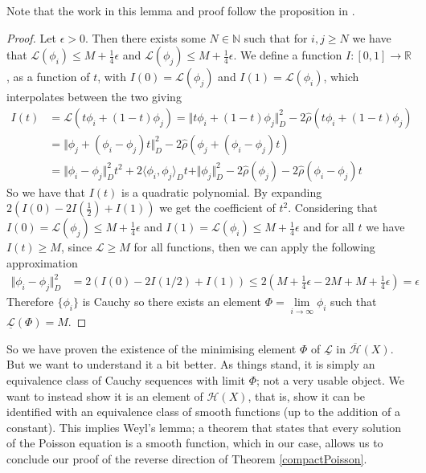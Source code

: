 \documentclass[11pt]{report}
\theoremstyle{definition}
\begin{document}
Note that the work in this lemma and proof follow the proposition in \cite[p.30]{notes}.
\begin{proof}
  Let $\epsilon > 0$. Then there exists some $N \in \mathbb{N}$ such that for $i,j \geq N$ we have that $\mathcal{L}(\phi_i) \leq M + \frac{1}{4}\epsilon$ and $\mathcal{L}(\phi_j) \leq M + \frac{1}{4}\epsilon$. We define a function $I:[0,1] \rightarrow \mathbb{R}$, as a function of $t$, with $I(0) = \mathcal{L}(\phi_j)$ and $I(1) = \mathcal{L}(\phi_i)$, which interpolates between the two giving
  \begin{align*}
    I(t) &= \mathcal{L}(t\phi_i + (1-t)\phi_j) = \Vert t\phi_i + (1-t)\phi_j \Vert^2_D - 2\hat{\rho}(t\phi_i + (1-t)\phi_j) \\
         &= \Vert \phi_j + (\phi_i - \phi_j)t \Vert^2_D - 2\hat{\rho}(\phi_j + (\phi_i - \phi_j)t) \\
         &= \Vert \phi_i - \phi_j \Vert^2_Dt^2 + 2\langle \phi_i, \phi_j\rangle_Dt + \Vert \phi_j \Vert^2_D - 2\hat{\rho}(\phi_j) - 2\hat{\rho}(\phi_i - \phi_j)t
  \end{align*}
  So we have that $I(t)$ is a quadratic polynomial. By expanding $2(I(0) - 2I(\frac{1}{2})+I(1))$ we get the coefficient of $t^2$. Considering that $I(0)= \mathcal{L}(\phi_j) \leq  M + \frac{1}{4}\epsilon$ and $I(1) = \mathcal{L}(\phi_i) \leq  M + \frac{1}{4}\epsilon$ and for all $t$ we have $I(t) \geq M$, since $\mathcal{L} \geq M$ for all functions, then we can apply the following approximation
  \begin{align*}
    \Vert \phi_i - \phi_j \Vert^2_D &= 2(I(0) - 2I(1/2)+I(1)) \leq 2(M + \frac{1}{4}\epsilon -2M + M + \frac{1}{4}\epsilon) = \epsilon
  \end{align*}
  Therefore $\{\phi_i\}$ is Cauchy so there exists an element $\Phi = \lim\limits_{i \rightarrow \infty}\phi_i$ such that $\underline{\mathcal{L}}(\Phi) = M$.
\end{proof}
So we have proven the existence of the minimising element $\Phi$ of $\underline{\mathcal{L}}$ in $\overline{\mathcal{H}}(X)$. But we want to understand it a bit better. As things stand, it is simply an equivalence class of Cauchy sequences with limit $\Phi$; not a very usable object. We want to instead show it is an element of $\mathcal{H}(X)$, that is, show it can be identified with an equivalence class of smooth functions (up to the addition of a constant). This implies Weyl's lemma; a theorem that states that every solution of the Poisson equation is a smooth function, which in our case, allows us to conclude our proof of the reverse direction of Theorem \ref{compactPoisson}.
\end{document}
